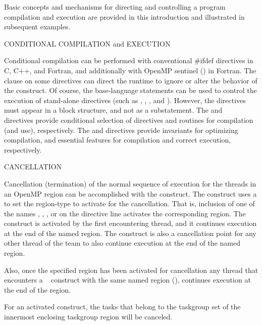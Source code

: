 \label{chap:program_control}

Basic concepts and mechanisms for directing and controlling a program compilation and execution
are provided in this introduction and illustrated in subsequent examples.

\bigskip
CONDITIONAL COMPILATION and EXECUTION

Conditional compilation can be performed with conventional \#ifdef directives
in C, C++, and Fortran, and additionally with OpenMP sentinel (\code{!\$}) in Fortran. 
The  clause on some directives
can direct the runtime to ignore or alter the behavior of the construct.
Of course, the base-language  statements can be used to control the execution
of stand-alone directives (such as , , , 
and  ).
However, the directives must appear in a block structure, and not as a substatement.
The  and ~ directives provide conditional 
selection of directives and routines for compilation (and use), respectively.
The  and  directives provide invariants
for optimizing compilation, and essential features for compilation 
and correct execution, respectively.


\bigskip
CANCELLATION

Cancellation (termination) of the normal sequence of execution for the threads in an OpenMP region can
be  accomplished with the  construct.  The construct uses a
 to set the region-type to activate for the cancellation. 
That is, inclusion  of one of the  names , , 
,  or  on the directive line 
activates the corresponding region.  
The  construct is activated by the first encountering thread,  and it
continues execution at the end of the named region.
The  construct is also a cancellation point for any other thread of the team 
to also continue execution at the end of the named region.  

Also, once the specified region has been activated for cancellation any thread that encounters
a ~ construct with the same named region (),
continues execution at the end of the region.

For an activated  construct, the tasks that
belong to the taskgroup set of the innermost enclosing taskgroup region will be canceled. 

